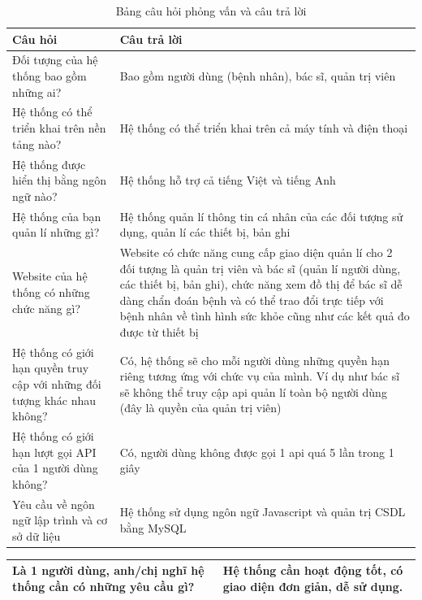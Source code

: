 \begin{table}[H]
    \centering
    \caption{Bảng câu hỏi phỏng vấn và câu trả lời}
    \begin{tabularx}{0.9\textwidth}{
    | >{\raggedright\arraybackslash}X
    | >{\raggedright\arraybackslash}X|
    }
    \hline
    \bfseries Câu hỏi                              &   \bfseries Câu trả lời \\\hline
    Đối tượng của hệ thống bao gồm những ai?       &   Bao gồm người dùng (bệnh nhân), bác sĩ, quản trị viên \\\hline
    Hệ thống có thể triển khai trên nền tảng nào?  &   Hệ thống có thể triển khai trên cả máy tính và điện thoại \\\hline
    Hệ thống được hiển thị bằng ngôn ngữ nào?      &   Hệ thống hỗ trợ cả tiếng Việt và tiếng Anh\\\hline
    Hệ thống của bạn quản lí những gì?             &   Hệ thống quản lí thông tin cá nhân của các đối tượng sử dụng, quản lí các thiết bị, bản ghi \\\hline
    Website của hệ thống có những chức năng gì?    &   Website có chức năng cung cấp giao diện quản lí cho 2 đối tượng là quản trị viên và bác sĩ (quản lí người dùng, các thiết bị, bản ghi), chức năng xem đồ thị để bác sĩ dễ dàng chẩn đoán bệnh và có thể trao đổi trực tiếp với bệnh nhân về tình hình sức khỏe cũng như các kết quả đo được từ thiết bị \\\hline
    Hệ thống có giới hạn quyền truy cập với những đối tượng khác nhau không?   &  Có, hệ thống sẽ cho mỗi người dùng những quyền hạn riêng tương ứng với chức vụ của mình. Ví dụ như bác sĩ sẽ không thể truy cập api quản lí toàn bộ người dùng (đây là quyền của quản trị viên) \\\hline
    Hệ thống có giới hạn lượt gọi API của 1 người dùng không?                  &  Có, người dùng không được gọi 1 api quá 5 lần trong 1 giây \\\hline
    Yêu cầu về ngôn ngữ lập trình và cơ sở dữ liệu &   Hệ thống sử dụng ngôn ngữ Javascript và quản trị CSDL bằng MySQL \\\hline
    \end{tabularx}
\end{table}
\begin{tabularx}{0.9\textwidth}{
    | >{\raggedright\arraybackslash}X
    | >{\raggedright\arraybackslash}X|
    }
    \hline
    Là 1 người dùng, anh/chị nghĩ hệ thống cần có những yêu cầu gì?            &  Hệ thống cần hoạt động tốt, có giao diện đơn giản, dễ sử dụng. \\\hline
\end{tabularx}

